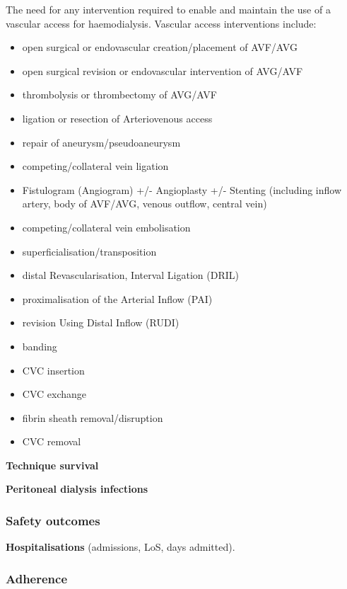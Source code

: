 \documentclass[
]{article}
\providecommand{\tightlist}{%
  \setlength{\itemsep}{0pt}\setlength{\parskip}{0pt}}
\begin{document}
The need for any intervention required to enable and maintain the use of a vascular access for haemodialysis.
Vascular access interventions include:
\begin{itemize}\tightlist
  \item open surgical or endovascular creation/placement of AVF/AVG
  \item open surgical revision or endovascular intervention of AVG/AVF
  \item thrombolysis or thrombectomy of AVG/AVF
  \item ligation or resection of Arteriovenous access
  \item repair of aneurysm/pseudoaneurysm
  \item competing/collateral vein ligation
  \item Fistulogram (Angiogram) +/- Angioplasty +/- Stenting (including inflow artery, body of AVF/AVG, venous outflow, central vein)
  \item competing/collateral vein embolisation
  \item superficialisation/transposition
  \item distal Revascularisation, Interval Ligation (DRIL)
  \item proximalisation of the Arterial Inflow (PAI)
  \item revision Using Distal Inflow (RUDI)
  \item banding
  \item CVC insertion
  \item CVC exchange
  \item fibrin sheath removal/disruption
  \item CVC removal
\end{itemize}


\textbf{Technique survival}

\textbf{Peritoneal dialysis infections}

\hypertarget{safety-outcomes}{
  \subsubsection{Safety outcomes}\label{safety-outcomes}}

\textbf{Hospitalisations} (admissions, LoS, days admitted).

\hypertarget{adherence-outcomes}{
  \subsubsection{Adherence}\label{adherence-outcomes}}
  
\end{document}
